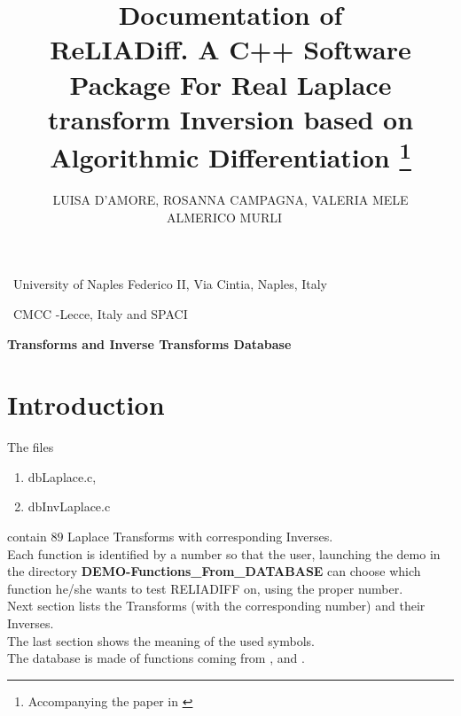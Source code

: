 \documentclass[10pt]{article}
\title{Documentation of  \\ReLIADiff. A C++ Software Package For Real Laplace
transform Inversion based on Algorithmic Differentiation
\footnote{Accompanying the paper in \cite{RELART}} }
\date{}
\begin{document}
\maketitle
\thispagestyle{empty}

\author{
\begin{center} LUISA D'AMORE\dag , ROSANNA CAMPAGNA\dag, VALERIA MELE\dag \\ ALMERICO MURLI\ddag \,  \

\end{center}}

{\dag\ University of Naples Federico II, Via Cintia,  Naples, Italy}


{\ddag\ CMCC -Lecce, Italy and SPACI}


\vspace{2cm}
\begin{center}
 {\large {\bf Transforms and Inverse Transforms Database
 }}
\end{center}
\vspace{2cm}

\setlength{\parindent}{0in}
\newpage
\setcounter{page}{1}
\tableofcontents

\newpage

\section{Introduction} \label{sec:1}

The files
\begin{enumerate}
  \item dbLaplace.c,
  \item dbInvLaplace.c
\end{enumerate}
contain $89$ Laplace Transforms with corresponding Inverses.\\
Each function is identified by a number so that the user, launching the demo in the directory
\textbf{DEMO-Functions\_From\_DATABASE} can choose which function he/she wants to test RELIADIFF on, using the proper number.\\

Next section lists the Transforms (with the corresponding number) and their Inverses.\\
The last section shows the meaning of the used symbols.\\

The database is made of functions coming from \cite{3}, \cite{4} and \cite{5}.

\newpage
\end{document}
